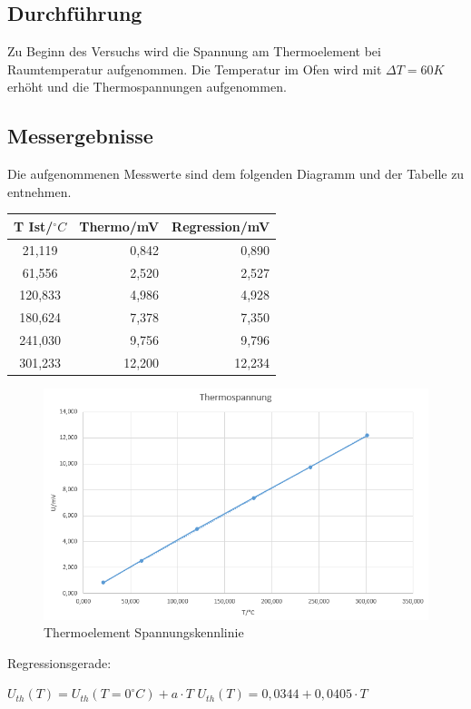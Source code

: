 \documentclass[a4paper,11pt,oneside]{article}
\begin{document}
\newpage

\subsection{Durchführung}
Zu Beginn des Versuchs wird die Spannung am Thermoelement bei Raumtemperatur aufgenommen. Die Temperatur im Ofen wird mit $\Delta T = 60K$ erhöht und die Thermospannungen aufgenommen. 
\subsection{Messergebnisse}
Die aufgenommenen Messwerte sind dem folgenden Diagramm und der Tabelle zu entnehmen.

\begin{center}
\begin{tabular}{|c|r|r|}
\hline 
T Ist/$^\circ C$ & Thermo/mV & Regression/mV \\ 
\hline 
21,119 & 0,842 & 0,890 \\ 
\hline 
61,556 & 2,520 & 2,527\\ 
\hline 
120,833 & 4,986 & 4,928\\ 
\hline 
180,624 & 7,378 & 7,350\\ 
\hline 
241,030 & 9,756 & 9,796\\ 
\hline 
301,233 & 12,200 & 12,234\\ 
\hline 
\end{tabular} 
\end{center}

\begin{figure}[h]
\centering
\includegraphics[scale=0.8]{Bilder/Aufg2Diagramm.png}
\caption{Thermoelement Spannungskennlinie}
\end{figure}

Regressionsgerade:
\begin{center}
$U_{th}(T) = U_{th}(T=0^\circ C) + a \cdot T$
$U_{th}(T) = 0,0344 + 0,0405 \cdot T$
\end{center}
\end{document}
